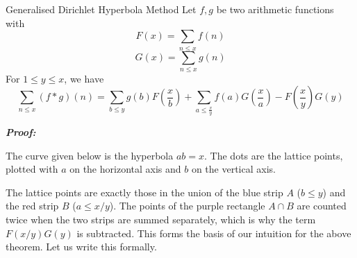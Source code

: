 \documentclass[a4paper,11pt,abstracton]{scrartcl}
\theoremstyle{dotlessP}
\theoremstyle{dotlessS}
\theoremstyle{remark}
\theoremstyle{definition}
\begin{document}
\begin{mainbox}{Generalised Dirichlet Hyperbola Method}
Let $f,g$ be two arithmetic functions with 
$$F(x)=\sum_{n \le x}f(n)$$
$$G(x)=\sum_{n \le x}g(n)$$
For $1 \le y \le x$, we have
$$\sum_{n \le x}(f*g)(n) = \sum_{b \le y}g(b)F(\frac{x}{b})+\sum_{a \le \frac{x}{y}}f(a)G(\frac{x}{a})-F(\frac{x}{y})G(y)$$
\end{mainbox}
 
\begin{claim_box}
\textbf{\textit{Proof:}}
 
The curve given below is the hyperbola $ab=x$. The dots are the lattice points, plotted with $a$ on the horizontal axis and $b$ on the vertical axis. 
 
\begin{center}
\end{center}
 
\noindent The lattice points are exactly those in the union of the blue strip $A$ ($b\le y$) and the red strip $B$ ($a\le x/y$). The points of the purple rectangle $A\cap B$ are counted twice when the two strips are summed separately, which is why the term $F(x/y)G(y)$ is subtracted. This forms the basis of our intuition for the above theorem. Let us write this formally.


\end{claim_box}
\end{document}
